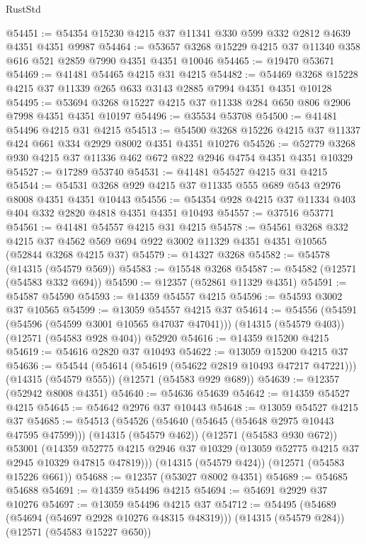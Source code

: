 \begin{lexlean}{RustStd}
\begin{coremodule}
@54451 := @54354 @15230 @4215 @37 @11341 @330 @599 @332 @2812 @4639 @4351 @4351 @9987
@54464 := @53657 @3268 @15229 @4215 @37 @11340 @358 @616 @521 @2859 @7990 @4351 @4351 @10046
@54465 := @19470 @53671
@54469 := @41481 @54465 @4215 @31 @4215
@54482 := @54469 @3268 @15228 @4215 @37 @11339 @265 @633 @3143 @2885 @7994 @4351 @4351 @10128
@54495 := @53694 @3268 @15227 @4215 @37 @11338 @284 @650 @806 @2906 @7998 @4351 @4351 @10197
@54496 := @35534 @53708
@54500 := @41481 @54496 @4215 @31 @4215
@54513 := @54500 @3268 @15226 @4215 @37 @11337 @424 @661 @334 @2929 @8002 @4351 @4351 @10276
@54526 := @52779 @3268 @930 @4215 @37 @11336 @462 @672 @822 @2946 @4754 @4351 @4351 @10329
@54527 := @17289 @53740
@54531 := @41481 @54527 @4215 @31 @4215
@54544 := @54531 @3268 @929 @4215 @37 @11335 @555 @689 @543 @2976 @8008 @4351 @4351 @10443
@54556 := @54354 @928 @4215 @37 @11334 @403 @404 @332 @2820 @4818 @4351 @4351 @10493
@54557 := @37516 @53771
@54561 := @41481 @54557 @4215 @31 @4215
@54578 := @54561
    @3268
    @332
    @4215
    @37
    @4562
    @569
    @694
    @922
    @3002
    @11329
    @4351
    @4351
    @10565
    (@52844 @3268 @4215 @37)
@54579 := @14327 @3268
@54582 := @54578 (@14315 (@54579 @569))
@54583 := @15548 @3268
@54587 := @54582 (@12571 (@54583 @332 @694))
@54590 := @12357 (@52861 @11329 @4351)
@54591 := @54587 @54590
@54593 := @14359 @54557 @4215
@54596 := @54593 @3002 @37 @10565
@54599 := @13059 @54557 @4215 @37
@54614 := @54556
    (@54591 (@54596 (@54599 @3001 @10565 @47037 @47041)))
    (@14315 (@54579 @403))
    (@12571 (@54583 @928 @404))
    @52920
@54616 := @14359 @15200 @4215
@54619 := @54616 @2820 @37 @10493
@54622 := @13059 @15200 @4215 @37
@54636 := @54544
    (@54614 (@54619 (@54622 @2819 @10493 @47217 @47221)))
    (@14315 (@54579 @555))
    (@12571 (@54583 @929 @689))
@54639 := @12357 (@52942 @8008 @4351)
@54640 := @54636 @54639
@54642 := @14359 @54527 @4215
@54645 := @54642 @2976 @37 @10443
@54648 := @13059 @54527 @4215 @37
@54685 := @54513
    (@54526
      (@54640 (@54645 (@54648 @2975 @10443 @47595 @47599)))
      (@14315 (@54579 @462))
      (@12571 (@54583 @930 @672))
      @53001
      (@14359 @52775 @4215 @2946 @37 @10329 (@13059 @52775 @4215 @37 @2945 @10329 @47815 @47819)))
    (@14315 (@54579 @424))
    (@12571 (@54583 @15226 @661))
@54688 := @12357 (@53027 @8002 @4351)
@54689 := @54685 @54688
@54691 := @14359 @54496 @4215
@54694 := @54691 @2929 @37 @10276
@54697 := @13059 @54496 @4215 @37
@54712 := @54495
    (@54689 (@54694 (@54697 @2928 @10276 @48315 @48319)))
    (@14315 (@54579 @284))
    (@12571 (@54583 @15227 @650))

\end{coremodule}
\end{lexlean}
